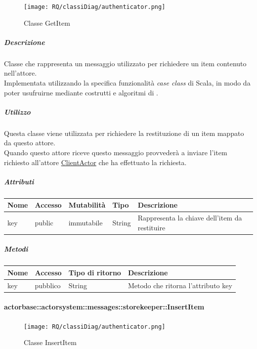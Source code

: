 \documentclass{scalatekids-article}
\begin{document}
\begin{figure}[H]
  \begin{center}
    \texttt{[image: RQ/classiDiag/authenticator.png]}
    \caption{Classe GetItem}
  \end{center}
\end{figure}

\subparagraph{Descrizione}
Classe che rappresenta un messaggio utilizzato per richiedere un item
contenuto nell'attore.\\Implementata utilizzando la specifica funzionalità \textit{case class} di Scala,
in modo da poter usufruirne mediante costrutti e algoritmi di
.

\subparagraph{Utilizzo}
Questa classe viene utilizzata per richiedere la restituzione di un
item mappato da questo attore.\\Quando questo attore riceve questo
messaggio provvederà a inviare l'item richiesto all'attore \hyperref[sec:actorbase::actorsystem::actors::clientactor::ClientActor]{ClientActor} che
ha effettuato la richiesta.

\subparagraph{Attributi}
\begin{tabular}{| p{2cm} | p{1.5cm} | p{2cm} | p{3cm} | p{8.5cm} |}
  \hline
  Nome & Accesso & Mutabilità & Tipo & Descrizione\\
  \hline
  key & public & immutabile & String & Rappresenta la chiave dell'item da restituire\\
  \hline
\end{tabular}

\subparagraph{Metodi}
\begin{tabular}{| l | l | l | l |}
  \hline
  Nome & Accesso & Tipo di ritorno & Descrizione\\
  \hline
  key & pubblico & String & Metodo che ritorna l'attributo key\\
  \hline
\end{tabular}

\paragraph{actorbase::actorsystem::messages::storekeeper::InsertItem}
\label{sec:actorbase::actorsystem::messages::storekeeper::InsertItem}

\begin{figure}[H]
  \begin{center}
    \texttt{[image: RQ/classiDiag/authenticator.png]}
    \caption{Classe InsertItem}
  \end{center}
\end{figure}
\end{document}
